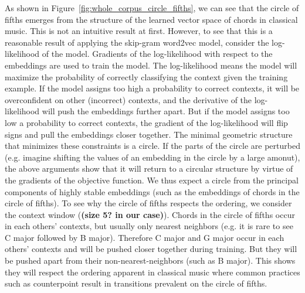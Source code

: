 
As shown in Figure~\ref{fig:whole_corpus_circle_fifths}, we can see that the circle of fifths emerges from the structure of the learned vector space of chords in classical music.
This is not an intuitive result at first.
However, to see that this is a reasonable result of applying the skip-gram word2vec model, consider the log-likelihood of the model.
Gradients of the log-likelihood with respect to the embeddings are used to train the model.
The log-likelihood means the model will maximize the probability of correctly classifying the context given the training example.
If the model assigns too high a probability to correct contexts, it will be overconfident on other (incorrect) contexts, and the derivative of the log-likelihood will push the embeddings further apart.
But if the model assigns too low a probability to correct contexts, the gradient of the log-likelihood will flip signs and pull the embeddings closer together.
The minimal geometric structure that minimizes these constraints is a circle. If the parts of the circle are perturbed (e.g. imagine shifting the values of an embedding in the circle by a large amonut), the above arguments show that it will return to a circular structure by virtue of the gradients of the objective function.
We thus expect a circle from the principal components of highly stable embeddings (such as the embeddings of chords in the circle of fifths).
To see why the circle of fifths respects the ordering, we consider the context window (\textbf{(size 5? in our case)}).
Chords in the circle of fifths occur in each others' contexts, but usually only nearest neighbors (e.g. it is rare to see C major followed by B major).
Therefore C major and G major occur in each others' contexts and will be pushed closer together during training.
But they will be pushed apart from their non-nearest-neighbors (such as B major).
This shows they will respect the ordering apparent in classical music where common practices such as counterpoint result in transitions prevalent on the circle of fifths.
